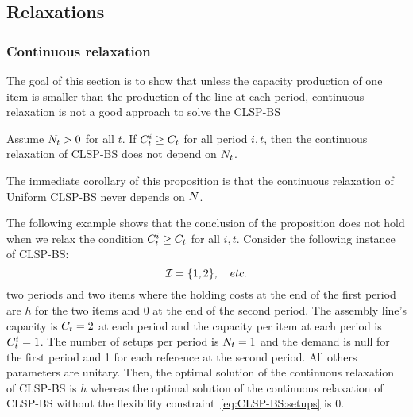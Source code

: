 \subsection{Relaxations}
\label{sec:PDP:deterministic:theoretical-results:continuous-relaxation}

\subsubsection{Continuous relaxation}

The goal of this section is to show that unless the capacity production of one item is smaller than the production of the line at each period, continuous relaxation is not a good approach to solve the CLSP-BS





\begin{prop}\label{prop:relaxation-independant-N}
Assume $N_t>0$ for all $t$.
If $C_t^i\ge C_t$ for all period $i,t$, then the continuous relaxation of CLSP-BS does not depend on $N_t$.
\end{prop}

The immediate corollary of this proposition is that the continuous relaxation of Uniform CLSP-BS never depends on $N$.


The following example shows that the conclusion of the proposition does not hold when we relax the condition $C_t^i\ge C_t$ for all $i,t$. Consider the following instance of CLSP-BS:
\begin{equation}
  \REF = \crbracket{1,2},\quad etc.   
\end{equation}
two periods and two items where the holding costs at the end of the first period are $h$ for the two items and 0 at the end of the second period. The assembly line's capacity is $C_t=2$ at each period and the capacity per item at each period is $C_t^i=1$. The number of setups per period is $N_t=1$ and the demand is null for the first period and 1 for each reference at the second period. All others parameters are unitary. Then, the optimal solution of the continuous relaxation of CLSP-BS is $h$ whereas the optimal solution of the continuous relaxation of CLSP-BS without the flexibility constraint~\eqref{eq:CLSP-BS:setups} is 0.

